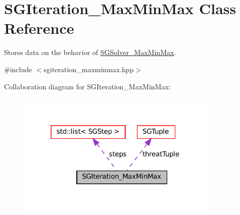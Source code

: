 \hypertarget{classSGIteration__MaxMinMax}{}\section{S\+G\+Iteration\+\_\+\+Max\+Min\+Max Class Reference}
\label{classSGIteration__MaxMinMax}


Stores data on the behavior of \hyperlink{classSGSolver__MaxMinMax}{S\+G\+Solver\+\_\+\+Max\+Min\+Max}.  




{\ttfamily \#include $<$sgiteration\+\_\+maxminmax.\+hpp$>$}



Collaboration diagram for S\+G\+Iteration\+\_\+\+Max\+Min\+Max\+:
\nopagebreak
\begin{figure}[H]
\begin{center}
\leavevmode
\includegraphics[width=271pt]{classSGIteration__MaxMinMax__coll__graph}
\end{center}
\end{figure}
